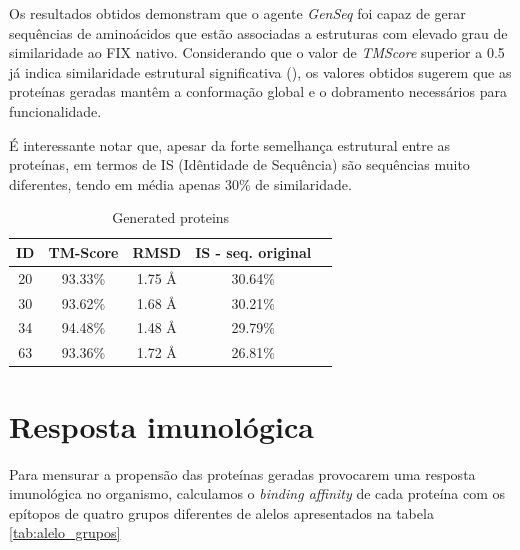 Os resultados obtidos demonstram que o agente \textit{GenSeq} foi capaz de gerar sequências de aminoácidos que
estão associadas a estruturas com elevado grau de similaridade ao FIX nativo.
Considerando que o valor de \textit{TMScore} superior a 0.5 já indica similaridade estrutural significativa (\cite{05TMScore}),
os valores obtidos sugerem que as proteínas geradas mantêm a conformação global e o dobramento necessários para funcionalidade.

É interessante notar que, apesar da forte semelhança estrutural entre as proteínas,
em termos de IS (Idêntidade de Sequência)
são sequências muito diferentes, tendo em média apenas 30\% de similaridade. 
  
\begin{table}[htbp]
    \centering
    \begin{tabular}{c|cccc}
        \hline
        \textbf{ID} & \textbf{TM-Score} & \textbf{RMSD} & \textbf{IS - seq. original} \\
        \hline
         20 & 93.33\% & 1.75 Å & 30.64\% \\
         30 & 93.62\% & 1.68 Å & 30.21\% \\
         34 & 94.48\% & 1.48 Å & 29.79\% \\
         63 & 93.36\% & 1.72 Å & 26.81\% \\
        \hline
    \end{tabular}
    \caption{Generated proteins}
    \label{tab:tabela_exemplo}
\end{table}



\section{Resposta imunológica}
\label{section:imuno_resultados}
Para mensurar a propensão das proteínas geradas provocarem uma resposta imunológica no organismo, 
calculamos o \textit{binding affinity} de cada proteína com os epítopos de quatro grupos diferentes 
de alelos apresentados na tabela \ref{tab:alelo_grupos}


